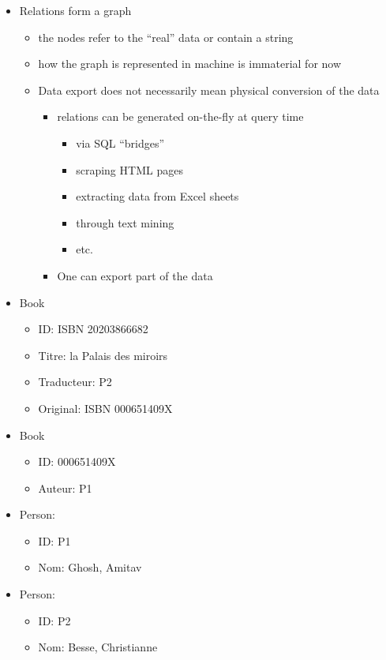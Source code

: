 \documentclass[a4paper,landscape,headrule,footrule,xetex]{foils}
\begin{document}

\begin{itemize}
\item Relations form a graph
  \begin{itemize}
  \item the nodes refer to the ``real'' data or contain a string
  \item how the graph is represented in machine is immaterial for now
  \item Data export does not necessarily mean physical conversion of the data
    \begin{itemize}
    \item relations can be generated on-the-fly at query time
      \begin{itemize}
      \item via SQL ``bridges''
      \item scraping HTML pages
      \item extracting data from Excel sheets
      \item through text mining
      \item etc.
      \end{itemize}
    \item One can export part of the data
    \end{itemize}
  \end{itemize}
\end{itemize}



\begin{itemize}\addtolength{\itemsep}{-1ex}
\item Book
  \begin{itemize}
  \item ID: ISBN 20203866682
  \item Titre: la Palais des miroirs
  \item Traducteur: P2
  \item Original: ISBN 000651409X
  \end{itemize}
\item Book
  \begin{itemize}
  \item ID: 000651409X
  \item Auteur: P1
  \end{itemize}
\item Person:
  \begin{itemize}
  \item ID: P1 
  \item Nom: Ghosh, Amitav
  \end{itemize}
\item Person:
  \begin{itemize}
  \item ID: P2 
  \item Nom: Besse, Christianne
  \end{itemize}

\end{itemize}
\end{document}
